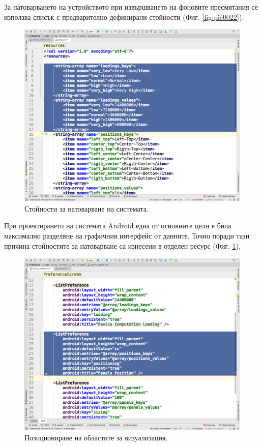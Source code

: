 \documentclass[book,14pt,oneside,openany]{memoir}
\begin{document}
За натоварването на устройството при извършването на фоновите пресмятания се използва списък с предварително дефинирани стойности (Фиг. \ref{fig:pic0022}). 

\begin{figure}[h]
  \centering
  \includegraphics[height=0.45\pdfpageheight]{./images/pic0023.png}
  \caption{Стойности за натоварване на системата.}
\label{fig:pic0023}
\end{figure}
\FloatBarrier

При проектирането на системата Android една от основните цели е била максимално разделяне на графичния интерфейс от данните. Точно поради тази причина стойностите за натоварване са изнесени в отделен ресурс (Фиг. \ref{fig:pic0023}).

\begin{figure}[h]
  \centering
  \includegraphics[height=0.45\pdfpageheight]{./images/pic0024.png}
  \caption{Позициониране на областите за визуализация.}
\label{fig:pic0024}
\end{figure}
\FloatBarrier
\end{document}
